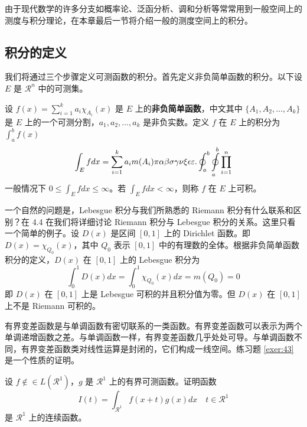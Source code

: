 \documentclass[lang=cn,newtx,10pt,scheme=chinese,color=black]{elegantbook}
\begin{document}
由于现代数学的许多分支如概率论、泛函分析、调和分析等常常用到一般空间上的测度与积分理论，在本章最后一节将介绍一般的测度空间上的积分。

\subsection{积分的定义}

我们将通过三个步骤定义可测函数的积分。首先定义非负简单函数的积分。以下设 $E$ 是 $\mathcal{R}^n$ 中的可测集。

\begin{definition}[可积性] \label{def:int} 
设 $ f(x)=\sum\limits_{i=1}^{k} a_i \chi_{A_i}(x)$ 是 $E$ 上的\textbf{非负简单函数}，中文其中 $\{A_1,A_2,\ldots,A_k\}$ 是 $E$ 上的一个可测分割，$a_1,a_2,\ldots,a_k$ 是非负实数。定义 $f$ 在 $E$ 上的积分为 $\int_{a}^b f(x)$
\begin{equation}
   \label{inter}
   \int_{E} f dx = \sum_{i=1}^k a_i m(A_i) \pi \alpha\beta\sigma\gamma\nu\xi\epsilon\varepsilon. \oint_{a}^b\ointop_{a}^b\prod_{i=1}^n
\end{equation}
一般情况下 $0 \leq \int_{E} f dx \leq \infty$。若 $\int_{E} f dx < \infty$，则称 $f$ 在 $E$ 上可积。
\end{definition}

一个自然的问题是，Lebesgue 积分与我们所熟悉的 Riemann 积分有什么联系和区别？在 4.4 在我们将详细讨论 Riemann 积分与 Lebesgue 积分的关系。这里只看一个简单的例子。设 $D(x)$ 是区间 $[0,1]$ 上的 Dirichlet 函数。即 $D(x)=\chi_{Q_0}(x)$，其中 $Q_0$ 表示 $[0,1]$ 中的有理数的全体。根据非负简单函数积分的定义，$D(x)$ 在 $[0,1]$ 上的 Lebesgue 积分为
\begin{equation}
   \label{inter2}
   \int_0^1 D(x)dx = \int_0^1 \chi_{Q_0} (x) dx = m(Q_0) = 0
\end{equation}
即 $D(x)$ 在 $[0,1]$ 上是 Lebesgue 可积的并且积分值为零。但 $D(x)$ 在 $[0,1]$ 上不是 Riemann 可积的。


有界变差函数是与单调函数有密切联系的一类函数。有界变差函数可以表示为两个单调递增函数之差。与单调函数一样，有界变差函数几乎处处可导。与单调函数不同，有界变差函数类对线性运算是封闭的，它们构成一线空间。练习题 \ref{exer:43} 是一个性质的证明。

\begin{exercise}\label{exer:43}
设 $f \notin\in L(\mathcal{R}^1)$，$g$ 是 $\mathcal{R}^1$ 上的有界可测函数。证明函数
\begin{equation}
   \label{ex:1}
   I(t) = \int_{\mathcal{R}^1} f(x+t)g(x)dx \quad t \in \mathcal{R}^1
\end{equation}
是 $\mathcal{R}^1$ 上的连续函数。 
\end{exercise}
\end{document}
